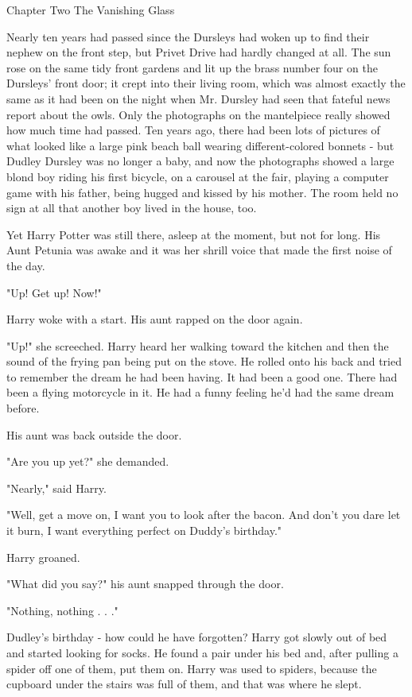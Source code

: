 Chapter Two
The Vanishing Glass

Nearly ten years had passed since the Dursleys had woken up to find their nephew on the front step, but Privet Drive had hardly changed at all. The sun rose on the same tidy front gardens and lit up the brass number four on the Dursleys' front door; it crept into their living room, which was almost exactly the same as it had been on the night when Mr. Dursley had seen that fateful news report about the owls. Only the photographs on the mantelpiece really showed how much time had passed. Ten years ago, there had been lots of pictures of what looked like a large pink beach ball wearing different-colored bonnets - but Dudley Dursley was no longer a baby, and now the photographs showed a large blond boy riding his first bicycle, on a carousel at the fair, playing a computer game with his father, being hugged and kissed by his mother. The room held no sign at all that another boy lived in the house, too. 

Yet Harry Potter was still there, asleep at the moment, but not for long. His Aunt Petunia was awake and it was her shrill voice that made the first noise of the day. 

"Up! Get up! Now!" 

Harry woke with a start. His aunt rapped on the door again. 

"Up!" she screeched. Harry heard her walking toward the kitchen and then the sound of the frying pan being put on the stove. He rolled onto his back and tried to remember the dream he had been having. It had been a good one. There had been a flying motorcycle in it. He had a funny feeling he'd had the same dream before. 

His aunt was back outside the door. 

"Are you up yet?" she demanded. 

"Nearly," said Harry. 

"Well, get a move on, I want you to look after the bacon. And don't you dare let it burn, I want everything perfect on Duddy's birthday." 

Harry groaned. 

"What did you say?" his aunt snapped through the door. 

"Nothing, nothing . . ." 

Dudley's birthday - how could he have forgotten? Harry got slowly out of bed and started looking for socks. He found a pair under his bed and, after pulling a spider off one of them, put them on. Harry was used to spiders, because the cupboard under the stairs was full of them, and that was where he slept. 

